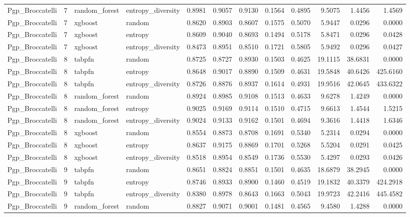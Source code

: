 \begin{tabular}{lrllrrrrrrrr}
Pgp_Broccatelli & 7 & random_forest & entropy_diversity & 0.8981 & 0.9057 & 0.9130 & 0.1564 & 0.4895 & 9.5075 & 1.4456 & 1.4569 \\
Pgp_Broccatelli & 7 & xgboost & random & 0.8620 & 0.8903 & 0.8607 & 0.1575 & 0.5070 & 5.9447 & 0.0296 & 0.0000 \\
Pgp_Broccatelli & 7 & xgboost & entropy & 0.8609 & 0.9040 & 0.8693 & 0.1494 & 0.5178 & 5.8471 & 0.0296 & 0.0428 \\
Pgp_Broccatelli & 7 & xgboost & entropy_diversity & 0.8473 & 0.8951 & 0.8510 & 0.1721 & 0.5805 & 5.9492 & 0.0296 & 0.0427 \\
Pgp_Broccatelli & 8 & tabpfn & random & 0.8725 & 0.8727 & 0.8930 & 0.1503 & 0.4625 & 19.1115 & 38.6831 & 0.0000 \\
Pgp_Broccatelli & 8 & tabpfn & entropy & 0.8648 & 0.9017 & 0.8890 & 0.1509 & 0.4631 & 19.5848 & 40.6426 & 425.6160 \\
Pgp_Broccatelli & 8 & tabpfn & entropy_diversity & 0.8726 & 0.8876 & 0.8937 & 0.1614 & 0.4931 & 19.9516 & 42.0645 & 433.6322 \\
Pgp_Broccatelli & 8 & random_forest & random & 0.8924 & 0.8985 & 0.9108 & 0.1513 & 0.4633 & 9.6278 & 1.4249 & 0.0000 \\
Pgp_Broccatelli & 8 & random_forest & entropy & 0.9025 & 0.9169 & 0.9114 & 0.1510 & 0.4715 & 9.6613 & 1.4544 & 1.5215 \\
Pgp_Broccatelli & 8 & random_forest & entropy_diversity & 0.9024 & 0.9133 & 0.9162 & 0.1501 & 0.4694 & 9.3616 & 1.4418 & 1.6346 \\
Pgp_Broccatelli & 8 & xgboost & random & 0.8554 & 0.8873 & 0.8708 & 0.1691 & 0.5340 & 5.2314 & 0.0294 & 0.0000 \\
Pgp_Broccatelli & 8 & xgboost & entropy & 0.8637 & 0.9175 & 0.8869 & 0.1701 & 0.5268 & 5.5204 & 0.0291 & 0.0425 \\
Pgp_Broccatelli & 8 & xgboost & entropy_diversity & 0.8518 & 0.8954 & 0.8549 & 0.1736 & 0.5530 & 5.4297 & 0.0293 & 0.0426 \\
Pgp_Broccatelli & 9 & tabpfn & random & 0.8651 & 0.8824 & 0.8851 & 0.1501 & 0.4635 & 18.6879 & 38.2945 & 0.0000 \\
Pgp_Broccatelli & 9 & tabpfn & entropy & 0.8746 & 0.8933 & 0.8900 & 0.1460 & 0.4519 & 19.1832 & 40.3379 & 424.2918 \\
Pgp_Broccatelli & 9 & tabpfn & entropy_diversity & 0.8380 & 0.8978 & 0.8643 & 0.1663 & 0.5043 & 19.9723 & 42.2416 & 445.4582 \\
Pgp_Broccatelli & 9 & random_forest & random & 0.8827 & 0.9071 & 0.9001 & 0.1481 & 0.4565 & 9.4580 & 1.4288 & 0.0000 \\

\end{tabular}
